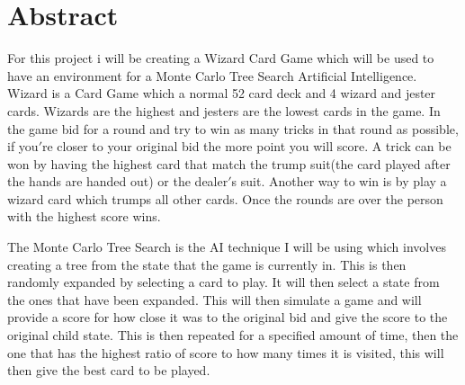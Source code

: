 \thispagestyle{empty}


\section*{\centering Abstract}

For this project i will be creating a Wizard Card Game which will be used to have an environment for a Monte Carlo Tree Search Artificial Intelligence. Wizard is a Card Game which a normal 52 card deck and 4 wizard and jester cards. Wizards are the highest and jesters are the lowest cards in the game. In the game bid for a round and try to win as many tricks in that round as possible, if you$'$re closer to your original bid the more point you will score. A trick can be won by having the highest card that match the trump suit(the card played after the hands are handed out) or the dealer$'$s suit. Another way to win is by play a wizard card which trumps all other cards. Once the rounds are over the person with the highest score wins.

The Monte Carlo Tree Search is the AI technique I will be using which involves creating a tree from the state that the game is currently in. This is then randomly expanded by selecting a card to play. It will then select a state from the ones that have been expanded. This will then simulate a game and will provide a score for how close it was to the original bid and give the score to the original child state. This is then repeated for a specified amount of time, then the one that has the highest ratio of score to how many times it is visited, this will then give the best card to be played.



